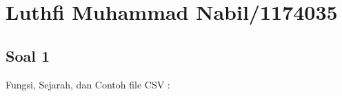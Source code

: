 
\section{Luthfi Muhammad Nabil/1174035}
\subsection{Soal 1}
Fungsi, Sejarah, dan Contoh file CSV : 
